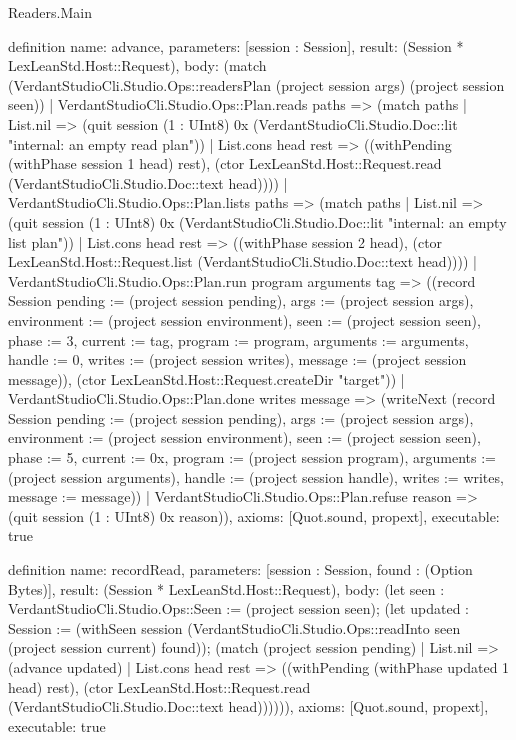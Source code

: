 \begin{lexlean}{Readers.Main}
\begin{semanticmodule}
definition{
  name: advance,
  parameters: [session : Session],
  result: (Session * LexLeanStd.Host::Request),
  body: (match (VerdantStudioCli.Studio.Ops::readersPlan (project session args) (project session seen))
    | VerdantStudioCli.Studio.Ops::Plan.reads paths => (match paths
      | List.nil => (quit session (1 : UInt8) 0x (VerdantStudioCli.Studio.Doc::lit "internal: an empty read plan\n"))
      | List.cons head rest => ((withPending (withPhase session 1 head) rest), (ctor LexLeanStd.Host::Request.read (VerdantStudioCli.Studio.Doc::text head))))
    | VerdantStudioCli.Studio.Ops::Plan.lists paths => (match paths
      | List.nil => (quit session (1 : UInt8) 0x (VerdantStudioCli.Studio.Doc::lit "internal: an empty list plan\n"))
      | List.cons head rest => ((withPhase session 2 head), (ctor LexLeanStd.Host::Request.list (VerdantStudioCli.Studio.Doc::text head))))
    | VerdantStudioCli.Studio.Ops::Plan.run program arguments tag => ((record Session {pending := (project session pending), args := (project session args), environment := (project session environment), seen := (project session seen), phase := 3, current := tag, program := program, arguments := arguments, handle := 0, writes := (project session writes), message := (project session message)}), (ctor LexLeanStd.Host::Request.createDir "target"))
    | VerdantStudioCli.Studio.Ops::Plan.done writes message => (writeNext (record Session {pending := (project session pending), args := (project session args), environment := (project session environment), seen := (project session seen), phase := 5, current := 0x, program := (project session program), arguments := (project session arguments), handle := (project session handle), writes := writes, message := message}))
    | VerdantStudioCli.Studio.Ops::Plan.refuse reason => (quit session (1 : UInt8) 0x reason)),
  axioms: [Quot.sound, propext],
  executable: true
}

definition{
  name: recordRead,
  parameters: [session : Session, found : (Option Bytes)],
  result: (Session * LexLeanStd.Host::Request),
  body: (let seen : VerdantStudioCli.Studio.Ops::Seen := (project session seen); (let updated : Session := (withSeen session (VerdantStudioCli.Studio.Ops::readInto seen (project session current) found)); (match (project session pending)
    | List.nil => (advance updated)
    | List.cons head rest => ((withPending (withPhase updated 1 head) rest), (ctor LexLeanStd.Host::Request.read (VerdantStudioCli.Studio.Doc::text head)))))),
  axioms: [Quot.sound, propext],
  executable: true
}


\end{semanticmodule}
\end{lexlean}
